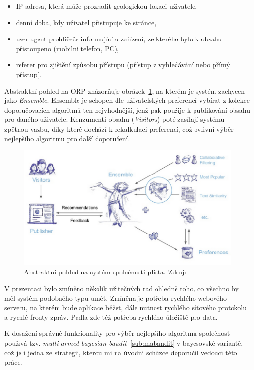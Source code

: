 \documentclass[thesis=M,czech]{FITthesis}[2014/05/07]
\begin{document}
\begin{itemize}
	\item IP adresa, která může prozradit geologickou lokaci uživatele,
	\item denní doba, kdy uživatel přistupuje ke stránce,
	\item user agent prohlížeče informující o zařízení, ze kterého bylo k obsahu přistoupeno (mobilní telefon, PC),
	\item referer pro zjištění způsobu přístupu (přístup z vyhledávání nebo přímý přístup). 
\end{itemize}

Abstraktní pohled na ORP znázorňuje obrázek~\ref{fig:plista}, na kterém je systém zachycen jako \emph{Ensemble}. Ensemble je schopen dle uživatelských preferencí vybírat z kolekce doporučovacích algoritmů ten nejvhodnější, jenž pak použije k publikování obsahu pro daného uživatele. Konzumenti obsahu (\emph{Visitors}) poté zasílají systému zpětnou vazbu, díky které dochází k rekalkulaci preferencí, což ovlivní výběr nejlepšího algoritmu pro další doporučení.

\begin{figure}\centering
	\includegraphics[width=1.0\textwidth]{obr/plistaEnsemble.png}
 	\caption[Abstraktní pohled na systém společnosti plista]{Abstraktní pohled na systém společnosti plista. Zdroj: \cite{slideshare:plista}}\label{fig:plista}
\end{figure}	

V prezentaci bylo zmíněno několik užitečných rad ohledně toho, co všechno by měl systém podobného typu umět. Zmíněna je potřeba rychlého webového serveru, na kterém bude aplikace běžet, dále nutnost rychlého síťového protokolu a rychlé fronty zpráv. Padla zde též potřeba rychlého úložiště pro data.

K dosažení správné funkcionality pro výběr nejlepšího algoritmu společnost používá tzv. \emph{multi-armed bayesian bandit}~\ref{sub:mabandit} v bayesovské variantě, což je i jedna ze strategií, kterou mi na úvodní schůzce doporučil vedoucí této práce.
\end{document}
